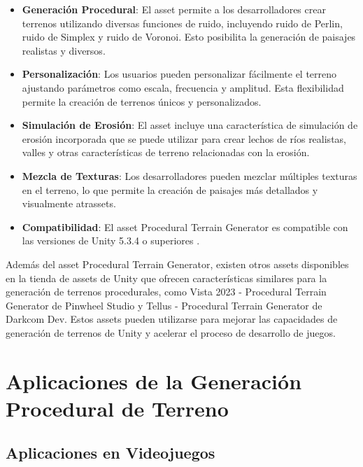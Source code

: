 \begin{itemize}
    \item \textbf{Generación Procedural}: El asset permite a los desarrolladores crear terrenos utilizando diversas funciones de ruido, incluyendo ruido de Perlin, ruido de Simplex y ruido de Voronoi. Esto posibilita la generación de paisajes realistas y diversos\cite{ProceduralTerrainGenerator}.
    
    \item \textbf{Personalización}: Los usuarios pueden personalizar fácilmente el terreno ajustando parámetros como escala, frecuencia y amplitud. Esta flexibilidad permite la creación de terrenos únicos y personalizados\cite{ProceduralTerrainGenerator}.
    
    \item \textbf{Simulación de Erosión}: El asset incluye una característica de simulación de erosión incorporada que se puede utilizar para crear lechos de ríos realistas, valles y otras características de terreno relacionadas con la erosión\cite{ProceduralTerrainGenerator}.
    
    \item \textbf{Mezcla de Texturas}: Los desarrolladores pueden mezclar múltiples texturas en el terreno, lo que permite la creación de paisajes más detallados y visualmente atrassets\cite{ProceduralTerrainGenerator}.
    
    \item \textbf{Compatibilidad}: El asset Procedural Terrain Generator es compatible con las versiones de Unity 5.3.4 o superiores \cite{ProceduralTerrainGenerator}.
\end{itemize}

Además del asset Procedural Terrain Generator, existen otros assets disponibles en la tienda de assets de Unity que ofrecen características similares para la generación de terrenos procedurales, como Vista 2023 - Procedural Terrain Generator de Pinwheel Studio\cite{Vista2023TerrainGenerator} y Tellus - Procedural Terrain Generator de Darkcom Dev\cite{TellusTerrainGenerator}. Estos assets pueden utilizarse para mejorar las capacidades de generación de terrenos de Unity y acelerar el proceso de desarrollo de juegos.
\newpage

\section{Aplicaciones de la Generación Procedural de Terreno}

\subsection{Aplicaciones en Videojuegos}

